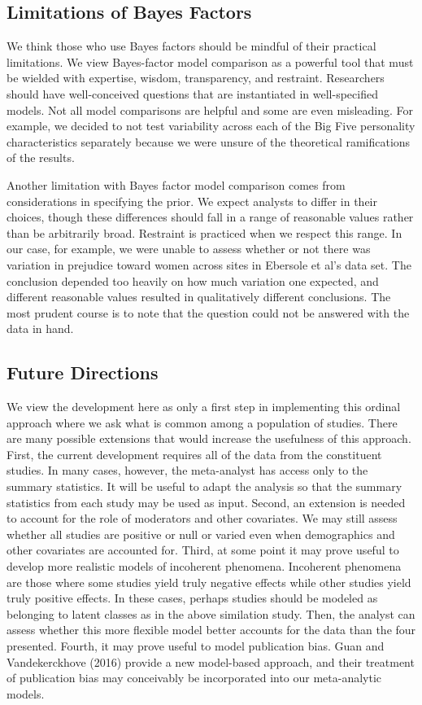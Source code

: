 \documentclass[english,man]{apa6}
\theoremstyle{definition}
\theoremstyle{definition}
\theoremstyle{definition}
\theoremstyle{remark}
\begin{document}
\subsection{Limitations of Bayes
Factors}\label{limitations-of-bayes-factors}

We think those who use Bayes factors should be mindful of their
practical limitations. We view Bayes-factor model comparison as a
powerful tool that must be wielded with expertise, wisdom, transparency,
and restraint. Researchers should have well-conceived questions that are
instantiated in well-specified models. Not all model comparisons are
helpful and some are even misleading. For example, we decided to not
test variability across each of the Big Five personality characteristics
separately because we were unsure of the theoretical ramifications of
the results.

Another limitation with Bayes factor model comparison comes from
considerations in specifying the prior. We expect analysts to differ in
their choices, though these differences should fall in a range of
reasonable values rather than be arbitrarily broad. Restraint is
practiced when we respect this range. In our case, for example, we were
unable to assess whether or not there was variation in prejudice toward
women across sites in Ebersole et al's data set. The conclusion depended
too heavily on how much variation one expected, and different reasonable
values resulted in qualitatively different conclusions. The most prudent
course is to note that the question could not be answered with the data
in hand.

\subsection{Future Directions}\label{future-directions}

We view the development here as only a first step in implementing this
ordinal approach where we ask what is common among a population of
studies. There are many possible extensions that would increase the
usefulness of this approach. First, the current development requires all
of the data from the constituent studies. In many cases, however, the
meta-analyst has access only to the summary statistics. It will be
useful to adapt the analysis so that the summary statistics from each
study may be used as input. Second, an extension is needed to account
for the role of moderators and other covariates. We may still assess
whether all studies are positive or null or varied even when
demographics and other covariates are accounted for. Third, at some
point it may prove useful to develop more realistic models of incoherent
phenomena. Incoherent phenomena are those where some studies yield truly
negative effects while other studies yield truly positive effects. In
these cases, perhaps studies should be modeled as belonging to latent
classes as in the above similation study. Then, the analyst can assess
whether this more flexible model better accounts for the data than the
four presented. Fourth, it may prove useful to model publication bias.
Guan and Vandekerckhove (2016) provide a new model-based approach, and
their treatment of publication bias may conceivably be incorporated into
our meta-analytic models.
\end{document}
